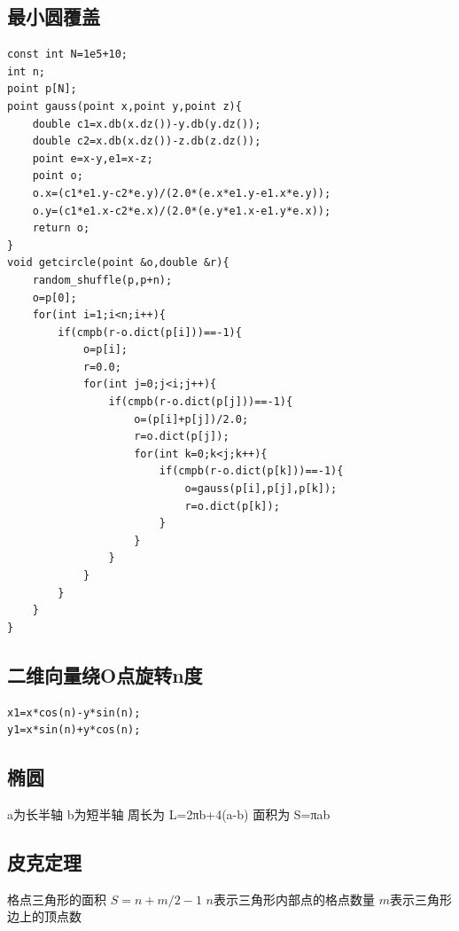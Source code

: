 \documentclass[12pt, a4paper, oneside]{ctexart}
\begin{document}
\newpage 
\subsection{最小圆覆盖} 
\begin{lstlisting}
const int N=1e5+10;
int n;
point p[N];
point gauss(point x,point y,point z){
    double c1=x.db(x.dz())-y.db(y.dz());
    double c2=x.db(x.dz())-z.db(z.dz());
    point e=x-y,e1=x-z;
    point o;
    o.x=(c1*e1.y-c2*e.y)/(2.0*(e.x*e1.y-e1.x*e.y));
    o.y=(c1*e1.x-c2*e.x)/(2.0*(e.y*e1.x-e1.y*e.x));
    return o;
}
void getcircle(point &o,double &r){
    random_shuffle(p,p+n);
    o=p[0];
    for(int i=1;i<n;i++){
        if(cmpb(r-o.dict(p[i]))==-1){
            o=p[i];
            r=0.0;
            for(int j=0;j<i;j++){
                if(cmpb(r-o.dict(p[j]))==-1){
                    o=(p[i]+p[j])/2.0;
                    r=o.dict(p[j]);
                    for(int k=0;k<j;k++){
                        if(cmpb(r-o.dict(p[k]))==-1){
                            o=gauss(p[i],p[j],p[k]);
                            r=o.dict(p[k]);
                        }
                    }
                }
            }
        }
    }
}
\end{lstlisting}

\newpage 
\subsection{二维向量绕O点旋转n度} 
\begin{lstlisting}
x1=x*cos(n)-y*sin(n);
y1=x*sin(n)+y*cos(n);
\end{lstlisting}

\subsection{椭圆} 
a为长半轴 b为短半轴 周长为 L=2πb+4(a-b) 面积为 S=πab


\subsection{皮克定理} 
格点三角形的面积 ${S=n+m/2-1}$  ${n}$表示三角形内部点的格点数量 ${m}$表示三角形边上的顶点数

\newpage 
\end{document}
